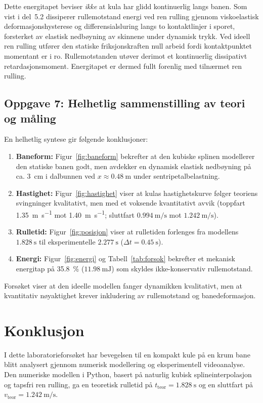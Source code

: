 \documentclass[11pt,a4paper]{article}
\begin{document}
Dette energitapet beviser \emph{ikke} at kula har glidd kontinuerlig langs banen. Som vist i del~5.2 dissiperer rullemotstand energi ved ren rulling gjennom viskoelastisk deformasjonshysterese og differensialsluring langs to kontaktlinjer i sporet, forsterket av elastisk nedbøyning av skinnene under dynamisk trykk. Ved ideell ren rulling utfører den statiske friksjonskraften null arbeid fordi kontaktpunktet momentant er i ro. Rullemotstanden utøver derimot et kontinuerlig dissipativt retardasjonsmoment. Energitapet er dermed fullt forenlig med tilnærmet ren rulling.

\subsection*{Oppgave 7: Helhetlig sammenstilling av teori og måling}
En helhetlig syntese gir følgende konklusjoner:
\begin{enumerate}
    \item \textbf{Baneform:} Figur~\ref{fig:baneform} bekrefter at den kubiske splinen modellerer den statiske banen godt, men avdekker en dynamisk elastisk nedbøyning på ca. \SI{3}{\centi\meter} i dalbunnen ved $x \approx \SI{0,48}{\meter}$ under sentripetalbelastning.
    \item \textbf{Hastighet:} Figur~\ref{fig:hastighet} viser at kulas hastighetskurve følger teoriens svingninger kvalitativt, men med et voksende kvantitativt avvik (toppfart \SI{1,35}{\meter\per\second} mot \SI{1,40}{\meter\per\second}; sluttfart $\SI{0,994}{\meter\per\second}$ mot $\SI{1,242}{\meter\per\second}$).
    \item \textbf{Rulletid:} Figur~\ref{fig:posisjon} viser at rulletiden forlenges fra modellens $\SI{1,828}{\second}$ til eksperimentelle $\SI{2,277}{\second}$ ($\Delta t = \SI{0,45}{\second}$).
    \item \textbf{Energi:} Figur~\ref{fig:energi} og Tabell~\ref{tab:forsok} bekrefter et mekanisk energitap på \SI{35,8}{\percent} ($\SI{11,98}{\milli\joule}$) som skyldes ikke-konservativ rullemotstand.
\end{enumerate}
Forsøket viser at den ideelle modellen fanger dynamikken kvalitativt, men at kvantitativ nøyaktighet krever inkludering av rullemotstand og banedeformasjon.

\section{Konklusjon}
I dette laboratorieforsøket har bevegelsen til en kompakt kule på en krum bane blitt analysert gjennom numerisk modellering og eksperimentell videoanalyse. Den numeriske modellen i Python, basert på naturlig kubisk splineinterpolasjon og tapsfri ren rulling, ga en teoretisk rulletid på $t_{\text{teor}} = \SI{1,828}{\second}$ og en sluttfart på $v_{\text{teor}} = \SI{1,242}{\meter\per\second}$.
\end{document}
